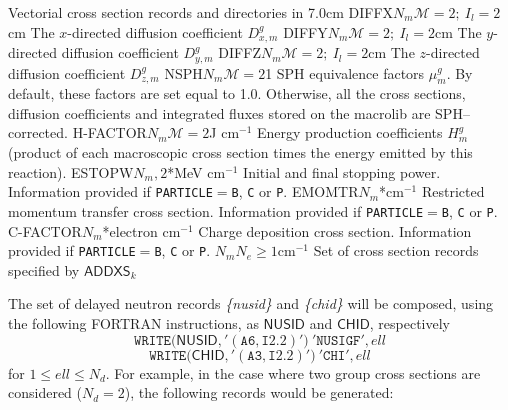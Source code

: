\begin{DescriptionEnregistrement}{Vectorial cross section records and directories in
}{7.0cm}
\OptRealEnr
  {DIFFX}{$N_{m}$}{$\mathcal{M}=2; \ I_{l}=2$}{cm}  
  {The $x$-directed diffusion coefficient
   $D_{x,m}^{g}$}
\OptRealEnr
  {DIFFY}{$N_{m}$}{$\mathcal{M}=2; \ I_{l}=2$}{cm}  
  {The $y$-directed diffusion coefficient
   $D_{y,m}^{g}$}
\OptRealEnr
  {DIFFZ}{$N_{m}$}{$\mathcal{M}=2; \ I_{l}=2$}{cm}  
  {The $z$-directed diffusion coefficient
   $D_{z,m}^{g}$}
\OptRealEnr
  {NSPH}{$N_{m}$}{$\mathcal{M}=2$}{1}  
  {SPH equivalence factors $\mu_{m}^{g}$. By default, these factors are set equal to 1.0.
  Otherwise, all the cross sections, diffusion coefficients and integrated fluxes stored on the {\sc
  macrolib} are SPH--corrected.}
\OptRealEnr
  {H-FACTOR}{$N_{m}$}{$\mathcal{M}=2$}{J cm$^{-1}$}  
  {Energy production coefficients $H_{m}^{g}$ (product of each macroscopic cross section
  times the energy emitted by this reaction).}
\OptRealEnr
  {ESTOPW}{$N_{m},2$}{*}{MeV cm$^{-1}$}  
  {Initial and final stopping power. Information provided if {\tt PARTICLE}$=${\tt B}, {\tt C} or {\tt P}.}
\OptRealEnr
  {EMOMTR}{$N_{m}$}{*}{cm$^{-1}$}  
  {Restricted momentum transfer cross section. Information provided if {\tt PARTICLE}$=${\tt B}, {\tt C} or {\tt P}.}
\OptRealEnr
  {C-FACTOR}{$N_{m}$}{*}{electron cm$^{-1}$}  
  {Charge deposition cross section. Information provided if {\tt PARTICLE}$=${\tt B}, {\tt C} or {\tt P}.}
\OptRealVar
  {}{$N_{m}$}{$N_{e}\ge 1$}{cm$^{-1}$}
  {Set of cross section records specified by $\mathsf{ADDXS}_{k}$}
\end{DescriptionEnregistrement}

The set of delayed neutron records {\sl \{nusid\}} and {\sl \{chid\}} will be
composed, using the following FORTRAN instructions, as $\mathsf{NUSID}$ and $\mathsf{CHID}$,
respectively
  \begin{displaymath}
    \mathtt{WRITE(}\mathsf{NUSID}\mathtt{,'(A6,I2.2)')} \ \mathtt{'NUSIGF'},ell
  \end{displaymath}
  \begin{displaymath}
    \mathtt{WRITE(}\mathsf{CHID}\mathtt{,'(A3,I2.2)')} \ \mathtt{'CHI'},ell
  \end{displaymath}
for $1\leq ell \leq N_d$. For example, in the case where two group cross sections are considered
($N_d=2$), the following records would be generated:

